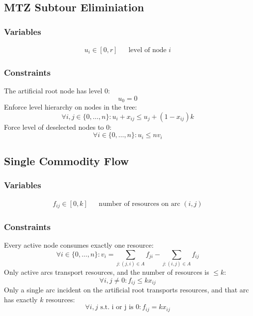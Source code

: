 \documentclass{article}
\begin{document}
\subsection{MTZ Subtour Eliminiation}


\subsubsection{Variables}
\begin{eqnarray}
u_i \in [0,r]  && \text{level of node $i$}
\end{eqnarray}
\subsubsection{Constraints}
The artificial root node has level $0$:
\begin{equation}
u_0 = 0
\end{equation}
Enforce level hierarchy on nodes in the tree:
\begin{equation}
\forall i, j \in\{0,\ldots,n\}: u_i + x_{ij} \leq u_j + (1 - x_{ij})k
\end{equation}
Force level of deselected nodes to $0$:
\begin{equation}
\forall i \in \{0,\ldots,n\}: u_i \leq nv_i
\end{equation}

\subsection{Single Commodity Flow}
\subsubsection{Variables}
\begin{eqnarray}
f_{ij} \in [0, k]  && \text{number of resources on arc $(i,j)$}
\end{eqnarray}
\subsubsection{Constraints}
Every active node consumes exactly one resource:
\begin{equation}
\forall i \in \{0,\ldots,n\}: v_i = \sum_{j: (j, i) \in A} f_{ji} - \sum_{j: (i, j) \in A} f_{ij}
\end{equation}
Only active arcs transport resources, and the number of resources is $\leq k$:
\begin{equation}
\forall i, j \neq 0: f_{ij} \leq kx_{ij}
\end{equation}
Only a single arc incident on the artificial root transports resources, and that arc
has exactly $k$ resources:
\begin{equation}
\forall i, j \text{ s.t. i or j is 0}: f_{ij} = kx_{ij}
\end{equation}
\end{document}
